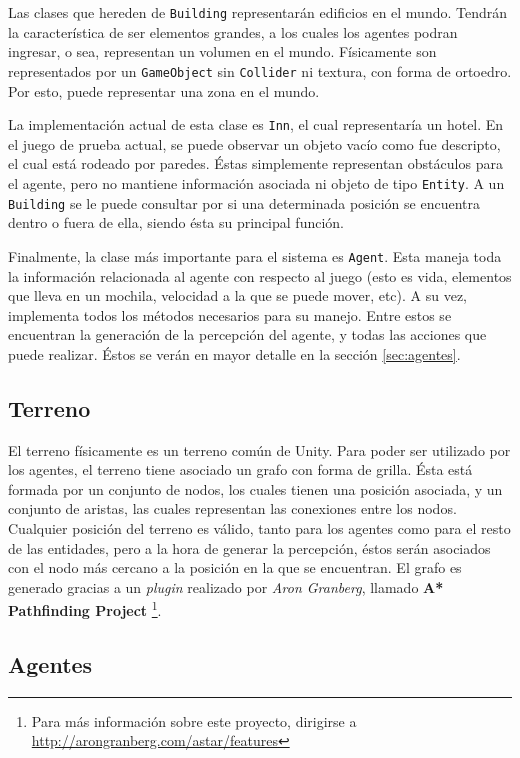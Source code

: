 \documentclass[a4paper,oneside]{article}
\begin{document}
Las clases que hereden de \texttt{Building} representarán edificios en el mundo. Tendrán
la característica de ser elementos grandes, a los cuales los agentes podran ingresar, o 
sea, representan un volumen en el mundo. Físicamente son representados por un 
\texttt{GameObject} sin \texttt{Collider} ni textura, con forma de ortoedro. Por esto, puede representar una zona en el mundo.

La implementación actual de esta clase es \texttt{Inn}, el cual representaría un hotel. En el juego de prueba actual, se puede observar un objeto vacío como fue
descripto, el cual está rodeado por paredes. Éstas simplemente representan obstáculos 
para el agente, pero no mantiene información asociada ni objeto de tipo \texttt{Entity}.
A un \texttt{Building} se le puede consultar por si una determinada posición se 
encuentra dentro o fuera de ella, siendo ésta su principal función.

Finalmente, la clase más importante para el sistema es \texttt{Agent}. Esta maneja toda
la información relacionada al agente con respecto al juego (esto es vida, elementos que
lleva en un mochila, velocidad a la que se puede mover, etc). A su vez, implementa todos
los métodos necesarios para su manejo. Entre estos se encuentran la generación de la 
percepción del agente, y todas las acciones que puede realizar. Éstos se verán en mayor
detalle en la sección \ref{sec:agentes}.

\subsection{Terreno}

El terreno físicamente es un terreno común de Unity. Para poder ser utilizado por los
agentes, el terreno tiene asociado un grafo con forma de grilla. Ésta está formada 
por un conjunto de nodos, los cuales tienen una posición asociada, y un conjunto de 
aristas, las cuales representan las conexiones entre los nodos. Cualquier posición del 
terreno es válido, tanto para los agentes como para el resto de las entidades, pero a la 
hora de generar la percepción, éstos serán asociados con el nodo más cercano a la 
posición en la que se encuentran. El grafo es generado gracias a un \textit{plugin} 
realizado por \textit{Aron Granberg}, llamado \textbf{A* Pathfinding Project} 
\footnote{Para más información sobre este proyecto, dirigirse a 
\url{http://arongranberg.com/astar/features}}.

\subsection{Agentes}
\end{document}

